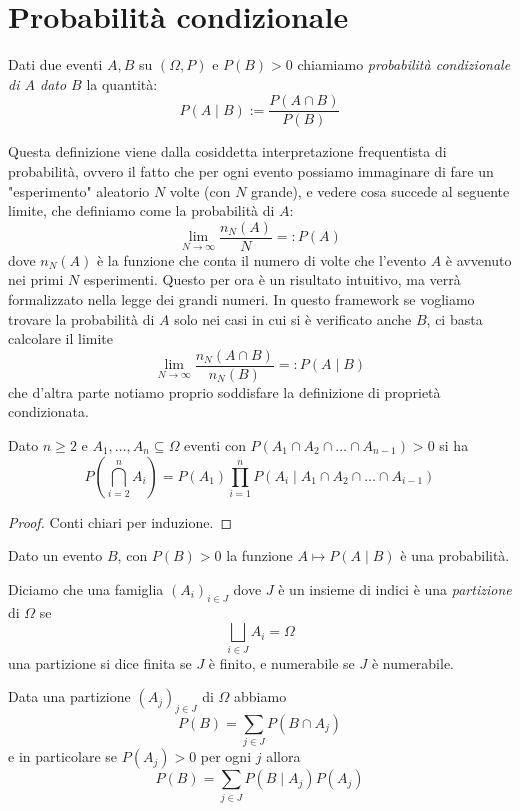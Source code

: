 \documentclass[11pt]{scrartcl}
\begin{document}
	\section{Probabilità condizionale}
	
	\begin{definition}
		Dati due eventi $A,B$ su $(\Omega,P)$ e $P(B)>0$ chiamiamo \textit{probabilità condizionale di $A$ dato $B$} la quantità:
		$$P(A\mid B):= \frac{P(A\cap B)}{P(B)}$$ 
	\end{definition}
	Questa definizione viene dalla cosiddetta interpretazione frequentista di probabilità, ovvero il fatto che per ogni evento possiamo immaginare di fare un "esperimento" aleatorio $N$ volte (con $N$ grande), e vedere cosa succede al seguente limite, che definiamo come la probabilità di $A$:
	$$\lim_{N\to\infty}\frac{n_N(A)}{N}=:P(A)$$
	dove $n_N(A)$ è la funzione che conta il numero di volte che l'evento $A$ è avvenuto nei primi $N$ esperimenti. Questo per ora è un risultato intuitivo, ma verrà formalizzato nella legge dei grandi numeri. In questo framework se vogliamo trovare la probabilità di $A$ solo nei casi in cui si è verificato anche $B$, ci basta calcolare il limite
	$$\lim_{N\to\infty}\frac{n_N(A\cap B)}{n_N(B)}=:P(A\mid B)$$
	che d'altra parte notiamo proprio soddisfare la definizione di proprietà condizionata.
	\begin{proposition}
		Dato $n\ge 2 $ e $A_1,\dots,A_n\subseteq \Omega$ eventi con $P(A_1\cap A_2\cap \dots \cap A_{n-1})>0$ si ha
		$$P\left(\bigcap_{i=2}^n A_i\right)=P(A_1)\prod_{i=1}^{n}P(A_i\mid A_1\cap A_2\cap \dots \cap A_{i-1})$$
	\end{proposition}
	\begin{proof}
		Conti chiari per induzione.
	\end{proof}
	\begin{remark}
		Dato un evento $B$, con $P(B)>0$ la funzione $A\mapsto P(A\mid B)$ è una probabilità.
	\end{remark}
	\begin{definition}[Partizione]
		Diciamo che una famiglia $\left(A_i\right)_{i\in J}$ dove $J$ è un insieme di indici è una \textit{partizione } di $\Omega$ se
		$$\bigsqcup_{i\in J}A_i=\Omega$$
		una partizione si dice finita se $J$ è finito, e numerabile se $J$ è numerabile.
	\end{definition}
	\begin{lemma}
		Data una partizione $(A_j)_{j\in J}$ di $\Omega$ abbiamo
		$$P(B)=\sum_{j\in J}P(B\cap A_j)$$
		e in particolare se $P(A_j)>0$ per ogni $j$ allora
		$$P(B)=\sum_{j\in J}P(B\mid A_j)P(A_j)$$
	\end{lemma}
\end{document}
